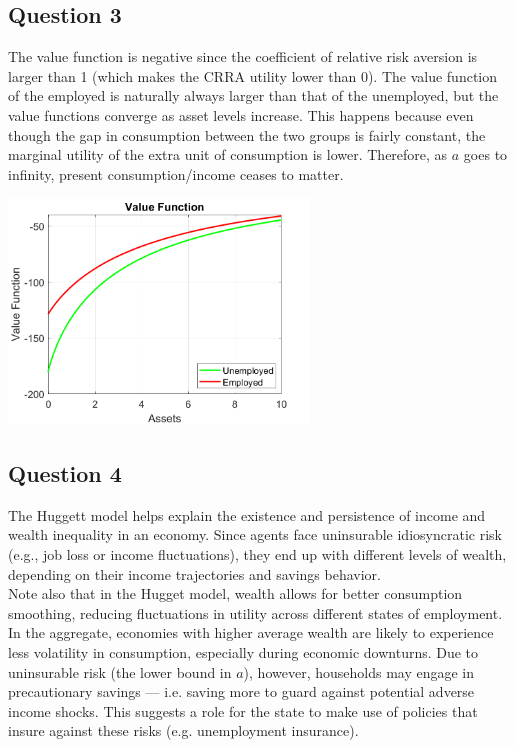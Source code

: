 \documentclass{article}
\begin{document}
\subsection*{Question 3}
The value function is negative since the coefficient of relative risk aversion is larger than 1 (which makes the CRRA utility lower than 0). The value function of the employed is naturally always larger than that of the unemployed, but the value functions converge as asset levels increase. This happens because even though the gap in consumption between the two groups is fairly constant, the marginal utility of the extra unit of consumption is lower. Therefore, as $a$ goes to infinity, present consumption/income ceases to matter.\\
\begin{center}
\includegraphics[width=0.6\textwidth]{homework/Solutions/homework_3_coding/value_function_vs_assets.png}
\end{center}

\subsection*{Question 4}
The Huggett model helps explain the existence and persistence of income and wealth inequality in an economy. Since agents face uninsurable idiosyncratic risk (e.g., job loss or income fluctuations), they end up with different levels of wealth, depending on their income trajectories and savings behavior.\\
Note also that in the Hugget model, wealth allows for better consumption smoothing, reducing fluctuations in utility across different states of employment. In the aggregate, economies with higher average wealth are likely to experience less volatility in consumption, especially during economic downturns. Due to uninsurable risk (the lower bound in $a$), however, households may engage in precautionary savings — i.e. saving more to guard against potential adverse income shocks. This suggests a role for the state to make use of policies that insure against these risks (e.g. unemployment insurance).\\
\end{document}
